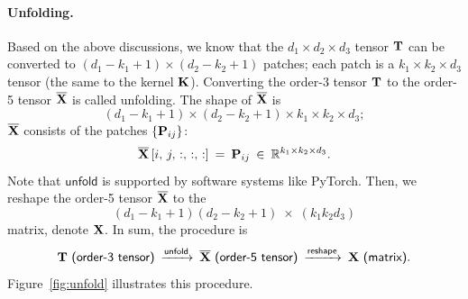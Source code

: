 \documentclass[11pt]{article}
\numberwithin{equation}{section}
\def\K{{\bf K}}
\def\PP{{\bf P}}
\def\T{{\bf T}}
\def\X{{\bf X}}
\def\RB{{\mathbb R}}
\begin{document}
\paragraph{Unfolding.}
Based on the above discussions, we know that the $d_1 \times d_2 \times d_3$ tensor $\T $ can be converted to $(d_1 - k_1 + 1) \times (d_2 - k_2 + 1)$ patches;
each patch is a $k_1 \times k_2 \times d_3$ tensor (the same to the kernel $\K$).
Converting the order-3 tensor $\T$ to the order-5 tensor $\overline{\X}$ is called \textsf{unfolding}.
The shape of $\overline{\X}$ is
\begin{equation*}
    (d_1 - k_1 + 1) \times (d_2 - k_2 + 1) \times k_1 \times k_2 \times d_3;
\end{equation*}
$\overline{\X}$ consists of the patches $\{\PP_{ij}\}$:
\begin{equation*}
    \overline{\X} \, [i, \, j, \, :, \, :, \, :] \: = \: \PP_{ij} \: \in \: \RB^{k_1 \times k_2 \times d_3}.
\end{equation*}
Note that $\textsf{unfold}$ is supported by software systems like PyTorch.
Then, we \textsf{reshape} the order-5 tensor $\overline{\X}$ to the
\begin{equation*}
     (d_1 - k_1 + 1)  (d_2 - k_2 + 1)  \; \times \; (k_1 k_2 d_3 )
\end{equation*}
matrix, denote $\X$.
In sum, the procedure is
\begin{equation*}
    \T \textsf{ (order-3 tensor)}
    \: \xrightarrow{\textsf{unfold}} \:
    \overline{\X} \textsf{ (order-5 tensor)}
    \: \xrightarrow{\textsf{reshape}} \:
    \X \textsf{ (matrix)} .
\end{equation*}
Figure~\ref{fig:unfold} illustrates this procedure.
\end{document}
